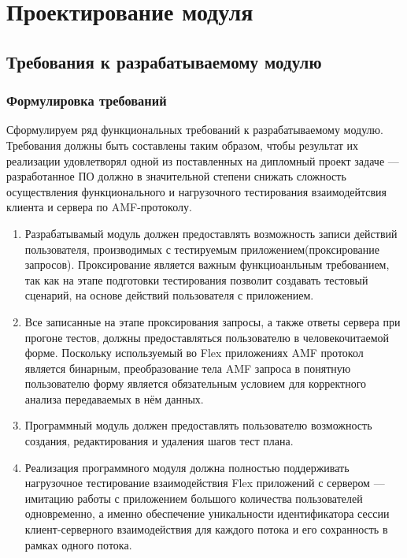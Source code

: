 \chapter{Проектирование модуля}

\section{Требования к разрабатываемому модулю}

\subsection{Формулировка требований}
Сформулируем ряд функциональных требований к разрабатываемому модулю. Требования должны быть составлены 
таким образом, чтобы результат их реализации удовлетворял одной из поставленных на дипломный проект задаче ---
разработанное ПО должно в значительной степени снижать сложность осуществления функционального
и нагрузочного тестирования взаимодейтсвия клиента и сервера по AMF-протоколу.

\begin{enumerate}
\item Разрабатывамый модуль должен предоставлять возможность записи действий пользователя, 
производимых с тестируемым приложением(проксирование запросов). Проксирование является важным функциоанльным
требованием, так как на этапе подготовки тестирования позволит создавать тестовый сценарий, на основе действий 
пользователя с приложением.
\item Все записанные на этапе проксирования запросы, а также ответы сервера при прогоне тестов, 
должны предоставляться пользователю в человекочитаемой 
форме. Поскольку используемый во Flex приложениях AMF протокол является бинарным, преобразование тела AMF 
запроса в понятную пользователю форму является обязательным условием для корректного анализа передаваемых в 
нём данных. 
\item Программный модуль должен предоставлять пользователю возможность создания, редактирования и удаления 
шагов тест плана.
\item Реализация программного модуля должна полностью поддерживать нагрузочное тестирование взаимодействия Flex приложений с сервером --- 
имитацию работы с приложением большого количества пользователей одновременно, а именно обеспечение уникальности 
идентификатора сессии клиент-серверного взаимодействия для каждого потока и его сохранность в рамках одного потока.
\end{enumerate}

